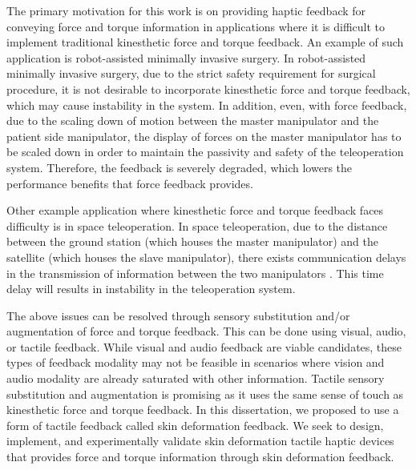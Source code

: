 The primary motivation for this work is on providing haptic feedback for conveying force and torque information in applications where it is difficult to implement traditional kinesthetic force and torque feedback. An example of such application is robot-assisted minimally invasive surgery. In robot-assisted minimally invasive surgery, due to the strict safety requirement for surgical procedure, it is not desirable to incorporate kinesthetic force and torque feedback, which may cause instability in the system. In addition, even, with force feedback, due to the scaling down of motion between the master manipulator and the patient side manipulator, the display of forces on the master manipulator has to be scaled down in order to maintain the passivity and safety of the teleoperation system. Therefore, the feedback is severely degraded, which lowers the performance benefits that force feedback provides.

Other example application where kinesthetic force and torque feedback faces difficulty is in space teleoperation. In space teleoperation, due to the distance between the ground station (which houses the master manipulator) and the satellite (which houses the slave manipulator), there exists communication delays in the transmission of information between the two manipulators \cite{Sheridan1993}. This time delay will results in instability in the teleoperation system.

The above issues can be resolved through sensory substitution and/or augmentation of force and torque feedback. This can be done using visual, audio, or tactile feedback. While visual and audio feedback are viable candidates, these types of feedback modality may not be feasible in scenarios where vision and audio modality are already saturated with other information. Tactile sensory substitution and augmentation is promising as it uses the same sense of touch as kinesthetic force and torque feedback. In this dissertation, we proposed to use a form of tactile feedback called skin deformation feedback. We seek to design, implement, and experimentally validate skin deformation tactile haptic devices that provides force and torque information through skin deformation feedback.


